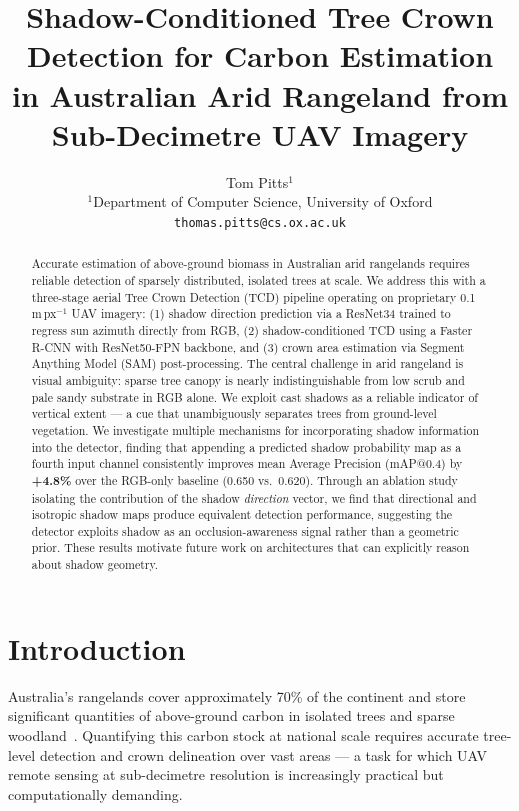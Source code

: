 \documentclass[10pt,twocolumn]{article}
\title{Shadow-Conditioned Tree Crown Detection for Carbon Estimation\\
       in Australian Arid Rangeland from Sub-Decimetre UAV Imagery}
\author{
  Tom Pitts$^{1}$ \\
  $^{1}$Department of Computer Science, University of Oxford \\
  \texttt{thomas.pitts@cs.ox.ac.uk}
}
\date{}
\begin{document}
\maketitle

\begin{abstract}
Accurate estimation of above-ground biomass in Australian arid rangelands
requires reliable detection of sparsely distributed, isolated trees at scale.
We address this with a three-stage aerial Tree Crown Detection (TCD) pipeline
operating on proprietary 0.1\,m\,px$^{-1}$ UAV imagery: (1) shadow direction
prediction via a ResNet34 trained to regress sun azimuth directly from RGB,
(2) shadow-conditioned TCD using a Faster R-CNN with ResNet50-FPN backbone,
and (3) crown area estimation via Segment Anything Model (SAM) post-processing.
The central challenge in arid rangeland is visual ambiguity: sparse tree canopy
is nearly indistinguishable from low scrub and pale sandy substrate in RGB alone.
We exploit cast shadows as a reliable indicator of vertical extent --- a cue that
unambiguously separates trees from ground-level vegetation. We investigate
multiple mechanisms for incorporating shadow information into the detector,
finding that appending a predicted shadow probability map as a fourth input
channel consistently improves mean Average Precision (mAP@0.4) by
\textbf{+4.8\%} over the RGB-only baseline (0.650 vs.\ 0.620). Through an
ablation study isolating the contribution of the shadow \emph{direction} vector,
we find that directional and isotropic shadow maps produce equivalent detection
performance, suggesting the detector exploits shadow as an occlusion-awareness
signal rather than a geometric prior. These results motivate future work on
architectures that can explicitly reason about shadow geometry.
\end{abstract}

\section{Introduction}

Australia's rangelands cover approximately 70\% of the continent and store
significant quantities of above-ground carbon in isolated trees and sparse
woodland~\cite{ma2021global}. Quantifying this carbon stock at national scale
requires accurate tree-level detection and crown delineation over vast areas ---
a task for which UAV remote sensing at sub-decimetre resolution is increasingly
practical but computationally demanding.
\end{document}
